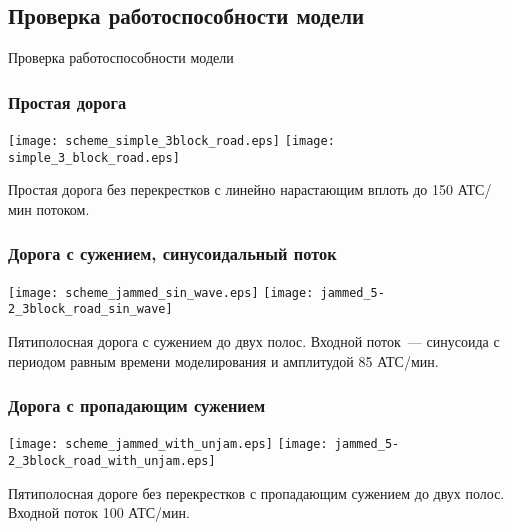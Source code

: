 \subsection{Проверка работоспособности модели}
\begin{frame}
    \begin{center}
        \Huge
        Проверка работоспособности модели
    \end{center}
\end{frame}

\begin{frame}
    \frametitle{Простая дорога}
  \hfil\hfil\texttt{[image: scheme\_simple\_3block\_road.eps]}\newline
  \vfil
  \hfil\hfil\texttt{[image: simple\_3\_block\_road.eps]}\hfil\hfil
    \begin{minipage}[b][0.5\textheight][c]{.45\linewidth}
    Простая дорога без перекрестков с линейно нарастающим вплоть до 150 АТС/мин потоком.
    \end{minipage}\newline
\end{frame}

\begin{frame}
    \frametitle{Дорога с сужением, синусоидальный поток}
  \hfil\hfil\texttt{[image: scheme\_jammed\_sin\_wave.eps]}\newline
  \vfil
  \hfil\hfil\texttt{[image: jammed\_5-2\_3block\_road\_sin\_wave]}\hfil\hfil
    \begin{minipage}[b][0.5\textheight][c]{.45\linewidth}
    Пятиполосная дорога с сужением до двух полос. Входной поток~--- синусоида с периодом равным времени моделирования и амплитудой 85 АТС/мин.
    \end{minipage}\newline
\end{frame}

\begin{frame}
    \frametitle{Дорога с пропадающим сужением}
  \hfil\hfil\texttt{[image: scheme\_jammed\_with\_unjam.eps]}\newline
  \vfil
  \hfil\hfil\texttt{[image: jammed\_5-2\_3block\_road\_with\_unjam.eps]}\hfil\hfil
    \begin{minipage}[b][0.5\textheight][c]{.45\linewidth}
    Пятиполосная дороге без перекрестков с пропадающим сужением до двух полос. Входной поток 100 АТС/мин.
    \end{minipage}\newline
\end{frame}

